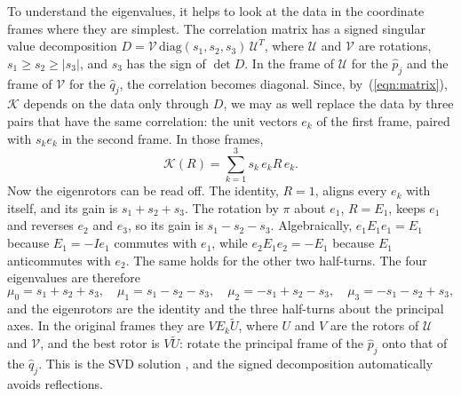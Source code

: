 \documentclass{birkjour}
\theoremstyle{definition}
\theoremstyle{remark}
\numberwithin{equation}{section}
\newcommand{\rev}[1]{\widetilde{#1}}
\newcommand{\K}{\mathcal{K}}
\begin{document}
To understand the eigenvalues, it helps to look at the data in the coordinate frames where they are simplest. The correlation matrix has a signed singular value decomposition $D = \mathcal V\, \mathrm{diag}(s_1, s_2, s_3)\, \mathcal U^T$, where $\mathcal U$ and $\mathcal V$ are rotations, $s_1 \geq s_2 \geq |s_3|$, and $s_3$ has the sign of $\det D$. In the frame of $\mathcal U$ for the $\hat p_j$ and the frame of $\mathcal V$ for the $\hat q_j$, the correlation becomes diagonal. Since, by~(\ref{eqn:matrix}), $\K$ depends on the data only through $D$, we may as well replace the data by three pairs that have the same correlation: the unit vectors $e_k$ of the first frame, paired with $s_k e_k$ in the second frame. In those frames,
\begin{equation*}
\K(R) = \sum_{k=1}^3 s_k\, e_k R\, e_k.
\end{equation*}
Now the eigenrotors can be read off. The identity, $R = 1$, aligns every $e_k$ with itself, and its gain is $s_1 + s_2 + s_3$. The rotation by $\pi$ about $e_1$, $R = E_1$, keeps $e_1$ and reverses $e_2$ and $e_3$, so its gain is $s_1 - s_2 - s_3$. Algebraically, $e_1 E_1 e_1 = E_1$ because $E_1 = -I e_1$ commutes with $e_1$, while $e_2 E_1 e_2 = -E_1$ because $E_1$ anticommutes with $e_2$. The same holds for the other two half-turns. The four eigenvalues are therefore
\begin{equation}
\label{eqn:spectrum}
\mu_0 = s_1 + s_2 + s_3, \quad \mu_1 = s_1 - s_2 - s_3, \quad \mu_2 = -s_1 + s_2 - s_3, \quad \mu_3 = -s_1 - s_2 + s_3,
\end{equation}
and the eigenrotors are the identity and the three half-turns about the principal axes. In the original frames they are $V E_k \rev{U}$, where $U$ and $V$ are the rotors of $\mathcal U$ and $\mathcal V$, and the best rotor is $V \rev{U}$: rotate the principal frame of the $\hat p_j$ onto that of the $\hat q_j$. This is the SVD solution \cite{Arun1987}, and the signed decomposition automatically avoids reflections.
\end{document}
